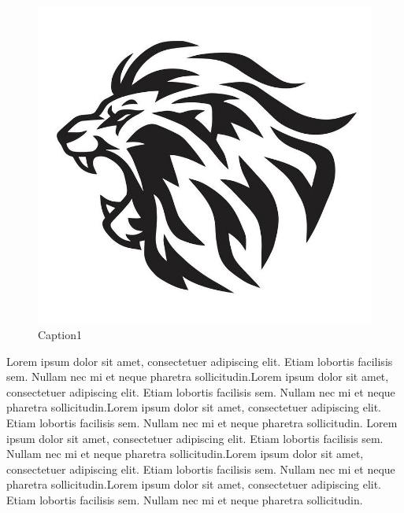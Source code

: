 \documentclass[12pt]{article}
\begin{document}

\begin{figure}
\includegraphics[width=0.9\linewidth]{./lion.jpg} 
\caption{Caption1}
\label{fig:wrapfig}
\end{figure}

Lorem ipsum dolor sit amet, consectetuer adipiscing elit. 
Etiam lobortis facilisis sem. Nullam nec mi et neque pharetra sollicitudin.Lorem ipsum dolor sit amet, consectetuer adipiscing elit. Etiam lobortis facilisis sem. Nullam nec mi et neque pharetra sollicitudin.Lorem ipsum dolor sit amet, consectetuer adipiscing elit. Etiam lobortis facilisis sem. Nullam nec mi et neque pharetra sollicitudin. Lorem ipsum dolor sit amet, consectetuer adipiscing elit. Etiam lobortis facilisis sem. Nullam nec mi et neque pharetra sollicitudin.Lorem ipsum dolor sit amet, consectetuer adipiscing elit. Etiam lobortis facilisis sem. Nullam nec mi et neque pharetra sollicitudin.Lorem ipsum dolor sit amet, consectetuer adipiscing elit. Etiam lobortis facilisis sem. Nullam nec mi et neque pharetra sollicitudin.




\vspace{30pt}
\end{document}
